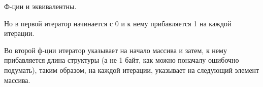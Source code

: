 Ф-ции  и  эквивалентны.

Но в первой итератор  начинается с 0 и к нему прибавляется 1 на каждой итерации.

Во второй ф-ции итератор  указывает на начало массива и затем, к нему прибавляется длина структуры 
(а не 1 байт, как можно поначалу ошибочно подумать),
таким образом, на каждой итерации,  указывает на следующий элемент массива.

